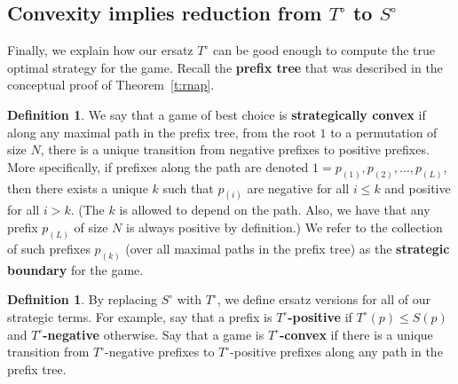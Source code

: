 \documentclass[11pt]{amsart}   %
\theoremstyle{definition}
\newtheorem{definition}[theorem]{Definition}
\theoremstyle{remark}
\numberwithin{equation}{section}
\theoremstyle{theorem}
\begin{document}
\bigskip
\subsection{Convexity implies reduction from $T^\circ$ to $S^\circ$}\label{s:red}

Finally, we explain how our ersatz $T^\circ$ can be good enough to compute the
true optimal strategy for the game.  Recall the {\bf prefix tree} that was
described in the conceptual proof of Theorem~\ref{t:rnap}.

\begin{definition}
We say that a game of best choice is {\bf strategically convex} if along any
maximal path in the prefix tree, from the root $1$ to a permutation of size
$N$, there is a unique transition from negative prefixes to positive prefixes.
More specifically, if prefixes along the path are denoted $1 = p_{(1)},
p_{(2)}, \ldots, p_{(L)}$, then there exists a unique $k$ such that $p_{(i)}$
are negative for all $i \leq k$ and positive for all $i > k$.  (The $k$ is
allowed to depend on the path.  Also, we have that any prefix $p_{(L)}$ of size
$N$ is always positive by definition.) We refer to the collection of such
prefixes $p_{(k)}$ (over all maximal paths in the prefix tree) as the {\bf
strategic boundary} for the game.
\end{definition}

\begin{definition}\label{d:stratconv}
By replacing $S^\circ$ with $T^\circ$, we define ersatz versions for all of
our strategic terms.  For example, say that a prefix is {\bf
$T^\circ$-positive} if $T^\circ(p) \leq S(p)$ and {\bf $T^\circ$-negative}
otherwise.  Say that a game is {\bf $T^\circ$-convex} if there is a unique
transition from $T^\circ$-negative prefixes to $T^\circ$-positive prefixes
along any path in the prefix tree.
\end{definition}
\end{document}
